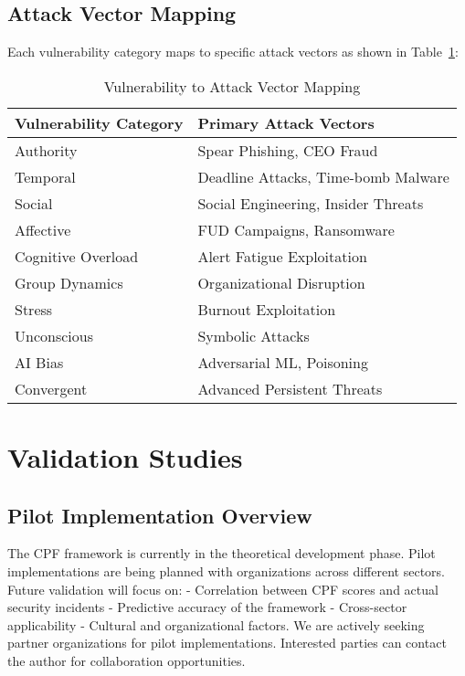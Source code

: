 \documentclass[11pt,a4paper]{article}
\begin{document}
\subsection{Attack Vector Mapping}

Each vulnerability category maps to specific attack vectors as shown in Table~\ref{tab:mapping}:

\begin{table}[ht!]
\centering
\caption{Vulnerability to Attack Vector Mapping}
\label{tab:mapping}
\begin{tabular}{ll}
\toprule
Vulnerability Category & Primary Attack Vectors \\
\midrule
Authority & Spear Phishing, CEO Fraud \\
Temporal & Deadline Attacks, Time-bomb Malware \\
Social & Social Engineering, Insider Threats \\
Affective & FUD Campaigns, Ransomware \\
Cognitive Overload & Alert Fatigue Exploitation \\
Group Dynamics & Organizational Disruption \\
Stress & Burnout Exploitation \\
Unconscious & Symbolic Attacks \\
AI Bias & Adversarial ML, Poisoning \\
Convergent & Advanced Persistent Threats \\
\bottomrule
\end{tabular}
\end{table}

\section{Validation Studies}

\subsection{Pilot Implementation Overview}

The CPF framework is currently in the theoretical development phase. Pilot implementations are being planned with organizations across different sectors. Future validation will focus on: - Correlation between CPF scores and actual security incidents - Predictive accuracy of the framework - Cross-sector applicability - Cultural and organizational factors. We are actively seeking partner organizations for pilot implementations. Interested parties can contact the author for collaboration opportunities.
\end{document}
